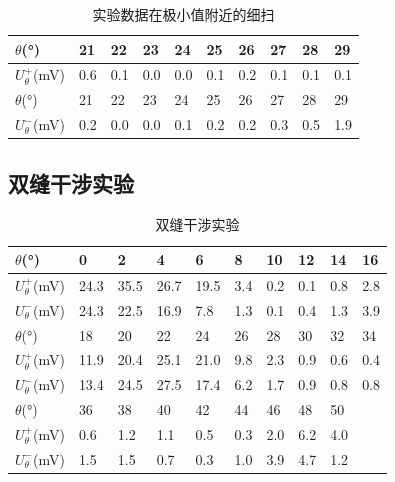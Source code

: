 \documentclass[zihao=5, UTF8]{article}
\theoremstyle{MyLineTheoremStyle} %
\theoremstyle{MyBlockTheoremStyle} %
\theoremstyle{MySubsubsectionStyle} %
\begin{document}
\begin{table}[H]
    \centering
    \begin{tabularx}{\textwidth}{|X|*{9}{X|}} %
        \hline
        \(\theta\)(°) & 21  & 22  & 23  & 24  & 25  & 26  & 27  & 28  & 29 \\ %
        \hline
        \(U_\theta^+\)(mV) & 0.6 & 0.1 & 0.0 & 0.0 & 0.1 & 0.2 & 0.1 & 0.1 & 0.1 \\ %
        \hline
        \(\theta\)(°) & 21  & 22  & 23  & 24  & 25  & 26  & 27  & 28  & 29 \\ %
        \hline
        \(U_\theta^-\)(mV) & 0.2 & 0.0 & 0.0 & 0.1 & 0.2 & 0.2 & 0.3 & 0.5 & 1.9 \\ %
        \hline
    \end{tabularx}
    \caption{实验数据在极小值附近的细扫}
    \label{实验数据在极小值附近的细扫表}
\end{table}

\subsection{双缝干涉实验}
\begin{table}[H]
    \centering
    \begin{tabularx}{\textwidth}{|X|*{9}{X|}} %
        \hline
        \(\theta\)(°) & 0  & 2  & 4  & 6  & 8  & 10 & 12 & 14 & 16 \\ %
        \hline
        \(U_\theta^+\)(mV) & 24.3 & 35.5 & 26.7 & 19.5 & 3.4 & 0.2 & 0.1 & 0.8 & 2.8 \\ %
        \hline
        \(U_\theta^-\)(mV) & 24.3 & 22.5 & 16.9 & 7.8 & 1.3 & 0.1 & 0.4 & 1.3 & 3.9 \\ %
        \hline
        \(\theta\)(°) & 18 & 20 & 22 & 24 & 26 & 28 & 30 & 32 & 34 \\ %
        \hline
        \(U_\theta^+\)(mV) & 11.9 & 20.4 & 25.1 & 21.0 & 9.8 & 2.3 & 0.9 & 0.6 & 0.4 \\ %
        \hline
        \(U_\theta^-\)(mV) & 13.4 & 24.5 & 27.5 & 17.4 & 6.2 & 1.7 & 0.9 & 0.8 & 0.8 \\ %
        \hline
        \(\theta\)(°) & 36 & 38 & 40 & 42 & 44 & 46 & 48 & 50 & \\ %
        \hline
        \(U_\theta^+\)(mV) & 0.6 & 1.2 & 1.1 & 0.5 & 0.3 & 2.0 & 6.2 & 4.0 & \\ %
        \hline
        \(U_\theta^-\)(mV) & 1.5 & 1.5 & 0.7 & 0.3 & 1.0 & 3.9 & 4.7 & 1.2 & \\ %
        \hline
    \end{tabularx}
    \caption{双缝干涉实验}
    \label{双缝干涉实验表}
\end{table}
\end{document}
